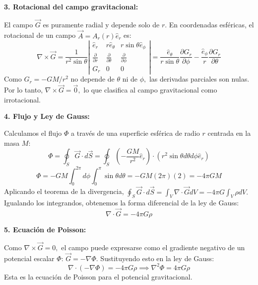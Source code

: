 \documentclass[a4paper]{article}
\begin{document}
\textbf{3. Rotacional del campo gravitacional:}

El campo $\vec{G}$ es puramente radial y depende solo de $r.$ En coordenadas esféricas, el rotacional de un campo $\vec{A} = A_r(r)\hat{e}_r$ es:
\begin{equation}
\nabla \times \vec{G} = \frac{1}{r^2 \sin \theta} \left| \begin{matrix} \hat{e}_r & r\hat{e}_\theta & r \sin \theta \hat{e}_\phi \\ \frac{\partial}{\partial r} & \frac{\partial}{\partial \theta} & \frac{\partial}{\partial \phi} \\ G_r & 0 & 0 \end{matrix} \right| = \frac{\hat{e}_\theta}{r \sin \theta} \frac{\partial G_r}{\partial \phi} - \frac{\hat{e}_\phi}{r} \frac{\partial G_r}{\partial \theta}
\end{equation}
Como $G_r = -GM/r^2$ no depende de $\theta$ ni de $\phi,$ las derivadas parciales son nulas. Por lo tanto, $\nabla \times \vec{G} = \vec{0},$ lo que clasifica al campo gravitacional como irrotacional.

\textbf{4. Flujo y Ley de Gauss:}

Calculamos el flujo $\Phi$ a través de una superficie esférica de radio $r$ centrada en la masa $M$:
\begin{equation}
\Phi = \oint_S \vec{G} \cdot d\vec{S} = \oint_S \left( -\frac{GM}{r^2}\hat{e}_r \right) \cdot (r^2 \sin \theta d\theta d\phi \hat{e}_r)
\end{equation}
\begin{equation}
\Phi = -GM \int_0^{2\pi} d\phi \int_0^\pi \sin \theta d\theta = -GM(2\pi)(2) = -4\pi GM
\end{equation}
Aplicando el teorema de la divergencia, $\oint_S \vec{G} \cdot d\vec{S} = \int_V \nabla \cdot \vec{G} dV = -4\pi G \int_V \rho dV.$ Igualando los integrandos, obtenemos la forma diferencial de la ley de Gauss:
\begin{equation}
\nabla \cdot \vec{G} = -4\pi G \rho
\end{equation}

\textbf{5. Ecuación de Poisson:}

Como $\nabla \times \vec{G} = 0,$ el campo puede expresarse como el gradiente negativo de un potencial escalar $\Phi$: $\vec{G} = -\nabla \Phi.$ Sustituyendo esto en la ley de Gauss:
\begin{equation}
\nabla \cdot (-\nabla \Phi) = -4\pi G \rho \implies \nabla^2 \Phi = 4\pi G \rho
\end{equation}
Esta es la ecuación de Poisson para el potencial gravitacional.
\end{document}
